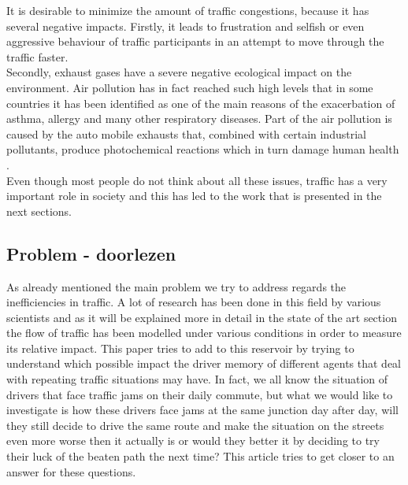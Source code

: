 \documentclass[a4paper,hidelinks]{article}
\begin{document}
It is desirable to minimize the amount of traffic congestions, because it has several negative impacts. Firstly, it leads to frustration and selfish or even aggressive behaviour of traffic participants in an attempt to move through the traffic faster. \\
Secondly, exhaust gases have a severe negative ecological impact on the environment. Air pollution has in fact reached such high levels that in some countries it has been identified as one of the main reasons of the exacerbation of asthma, allergy and many other respiratory diseases. Part of the air pollution is caused by the auto mobile exhausts that, combined with certain industrial pollutants, produce photochemical reactions which in turn damage human health \cite{ghose2005assessment}. \\
Even though most people do not think about all these issues, traffic has a very important role in society and this has led to the work that is presented in the next sections.


\subsection{Problem - doorlezen}
As already mentioned the main problem we try to address regards the inefficiencies in traffic. A lot of research has been done in this field by various scientists and as it will be explained more in detail in the state of the art section the flow of traffic has been modelled under various conditions in order to measure its relative impact. This paper tries to add to this reservoir by trying to understand which possible impact the driver memory of different agents that deal with repeating traffic situations may have. In fact, we all know the situation of drivers that face traffic jams on their daily commute, but what we would like to investigate is how these drivers face jams at the same junction day after day, will they still decide to drive the same route and make the situation on the streets even more worse then it actually is or would they better it by deciding to try their luck of the beaten path the next time? This article tries to get closer to an answer for these questions. 
\end{document}
